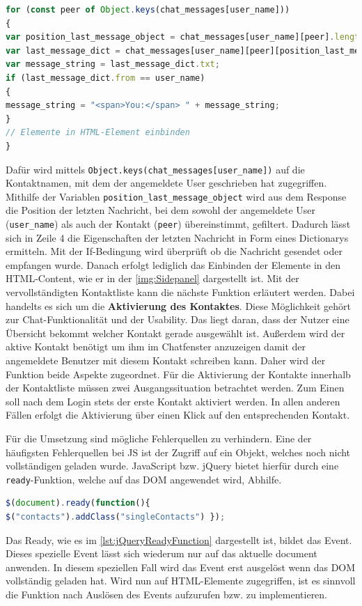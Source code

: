 \documentclass[a4paper,titlepage,halfparskip,12pt]{scrreprt}
\begin{document}
\begin{onehalfspacing}
\begin{lstlisting}[language=Javascript,caption=HTML Elemente für \textit{fillInContactPeers()},label={lst:HTMLElementsForContaclistfunction}]
for (const peer of Object.keys(chat_messages[user_name]))
{
var position_last_message_object = chat_messages[user_name][peer].length - 1;
var last_message_dict = chat_messages[user_name][peer][position_last_message_object];
var message_string = last_message_dict.txt;
if (last_message_dict.from == user_name)
{
message_string = "<span>You:</span> " + message_string;
}
// Elemente in HTML-Element einbinden
}
\end{lstlisting}
Dafür wird mittels \texttt{Object.keys(chat\_messages[user\_name])} auf die Kontaktnamen, mit dem der angemeldete User geschrieben hat zugegriffen. Mithilfe der Variablen \texttt{position\_last\_message\_object} wird aus dem Response die Position der letzten Nachricht, bei dem sowohl der angemeldete User (\texttt{user\_name}) als auch der Kontakt (\texttt{peer}) übereinstimmt, gefiltert. Dadurch lässt sich in Zeile 4 die Eigenschaften der letzten Nachricht in Form eines Dictionarys ermitteln. %
Mit der If-Bedingung wird überprüft ob die Nachricht gesendet oder empfangen wurde. Danach erfolgt lediglich das Einbinden der Elemente in den \ac{HTML}-Content, wie er in der \autoref{img:Sidepanel} dargestellt ist. Mit der vervollständigten Kontaktliste kann die nächste Funktion erläutert werden. Dabei handelts es sich um die \textbf{Aktivierung des Kontaktes}. Diese Möglichkeit gehört zur Chat-Funktionalität und der Usability. Das liegt daran, dass der Nutzer eine Übersicht bekommt welcher Kontakt gerade ausgewählt ist. Außerdem wird der aktive Kontakt benötigt um ihm im Chatfenster anzuzeigen damit der angemeldete Benutzer mit diesem Kontakt schreiben kann. Daher wird der Funktion beide Aspekte zugeordnet. Für die Aktivierung der Kontakte innerhalb der Kontaktliste müssen zwei Ausgangssituation betrachtet werden. Zum Einen soll nach dem Login stets der erste Kontakt aktiviert werden. In allen anderen Fällen erfolgt die Aktivierung über einen Klick auf den entsprechenden Kontakt.

Für die Umsetzung sind mögliche Fehlerquellen zu verhindern. Eine der häufigsten Fehlerquellen bei \ac{JS} ist der Zugriff auf ein Objekt, welches noch nicht vollständigen geladen wurde. JavaScript bzw. jQuery bietet hierfür durch eine \texttt{ready}-Funktion, welche auf das \ac{DOM} angewendet wird, Abhilfe.
\begin{lstlisting}[language=Javascript,caption= Ready() Funktion von jQuery,label={lst:jQueryReadyFunction}]
$(document).ready(function(){
$("contacts").addClass("singleContacts") });
\end{lstlisting}
Das \glqq Ready\grqq, wie es im \autoref{lst:jQueryReadyFunction} dargestellt ist, bildet das Event. Dieses spezielle Event lässt sich wiederum nur auf das aktuelle \glqq document\grqq{} anwenden. In diesem speziellen Fall wird das Event erst ausgelöst wenn das \ac{DOM} vollständig geladen hat. Wird nun auf \ac{HTML}-Elemente zugegriffen, ist es sinnvoll die Funktion nach Auslösen des Events aufzurufen bzw. zu implementieren. \cite{w3schoolsJQueryReady}


\end{onehalfspacing}
\end{document}
